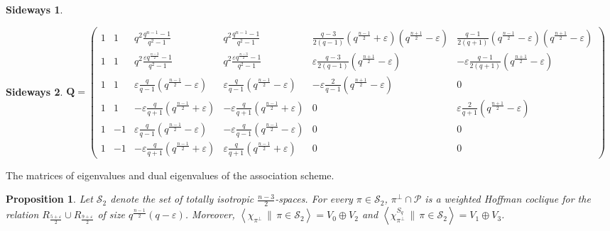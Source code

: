 \documentclass[10pt,a4paper]{amsart}
\newtheorem{sideways}{Sideways}
\newtheorem{prop}{Proposition}
\newcommand{\eps}{\varepsilon}
\newcommand{\ms}{\mathcal S}
\newcommand{\pp}{\mathcal P}
\newcommand{\vspann}[2]{\left \langle #1 \, \| \, #2 \right \rangle}
\begin{document}
\begin{table}
\begin{minipage}{.4\textwidth}
\begin{center}
\begin{sideways}
\end{sideways}
 \end{center}
\end{minipage}
\begin{minipage}{.4\textwidth}
 \begin{center}
\begin{sideways}
 $\displaystyle \mathbf Q = \begin{pmatrix}
 1 & 1 
  & q^2\frac{q^{n-1}-1}{q^2-1} 
  & q^2\frac{q^{n-1}-1}{q^2-1} 
  & \frac{q-3}{2(q-1)} \left( q^{\frac{n-1}2}+\eps\right) \left(q^{\frac{n+1}2}-\eps \right) 
  & \frac{q-1}{2(q+1)} \left( q^{\frac{n-1}2}-\eps\right) \left(q^{\frac{n+1}2}-\eps \right) \\[1em]
 1 & 1 
  & q^2 \frac{\eps q^{\frac{n-3}2}-1 }{ q^2-1 }
  & q^2 \frac{\eps q^{\frac{n-3}2}-1 }{ q^2-1 }
  & \eps \frac{q-3}{2(q-1)} \left( q^{\frac{n+1}2} - \eps \right)
  & -\eps \frac{q-1}{2(q+1)} \left( q^\frac{n+1}2 - \eps \right) \\[1em]
 1 & 1 
  & \eps \frac q{q-1} \left( q^{\frac{n-1}2} - \eps \right)
  & \eps \frac q{q-1} \left( q^{\frac{n-1}2} - \eps \right)
  & - \eps \frac{2}{q-1} \left( q^\frac{n+1}2 - \eps \right)
  & 0 \\[1em]
 1 & 1 
  & -\eps \frac q{q+1} \left( q^{\frac{n-1}2} + \eps \right)
  & -\eps \frac q{q+1} \left( q^{\frac{n-1}2} + \eps \right)
  & 0
  & \eps \frac2{q+1} \left( q^\frac{n+1}2 - \eps \right) \\[1em]
 1 & -1 
  & \eps \frac q{q-1} \left( q^{\frac{n-1}2} - \eps \right)
  & - \eps\frac q{q-1} \left( q^{\frac{n-1}2} - \eps \right) 
  & 0
  & 0 \\[1em]
 1 & -1 
  & - \eps \frac q{q+1} \left( q^{\frac{n-1}2} + \eps \right)
  & \eps \frac q{q+1} \left( q^{\frac{n-1}2} + \eps \right)
  & 0
  & 0
 \end{pmatrix}$
\end{sideways}
 \end{center}
\end{minipage}
 \caption{The matrices of eigenvalues and dual eigenvalues of the association scheme.}
 \label{Tab:Matrices}
\end{table}

\begin{prop}
 \label{Prop:RDisjointHoffman}
 Let $\ms_2$ denote the set of totally isotropic $\frac{n-3}2$-spaces.
 For every $\pi \in \ms_2$, $\pi^\perp \cap \pp$ is a weighted Hoffman coclique for the relation $R_\frac{5+\eps}2 \cup R_\frac{9+\eps}2$ of size $q^\frac{n-1}2(q-\eps)$.
 Moreover, $\vspann{\chi_{\pi^\perp}}{\pi \in \ms_2} = V_0 \oplus V_2$ and $\vspann{\chi_{\pi^\perp}^{S_q}}{\pi \in \ms_2} = V_1 \oplus V_3$.
\end{prop}
\end{document}
